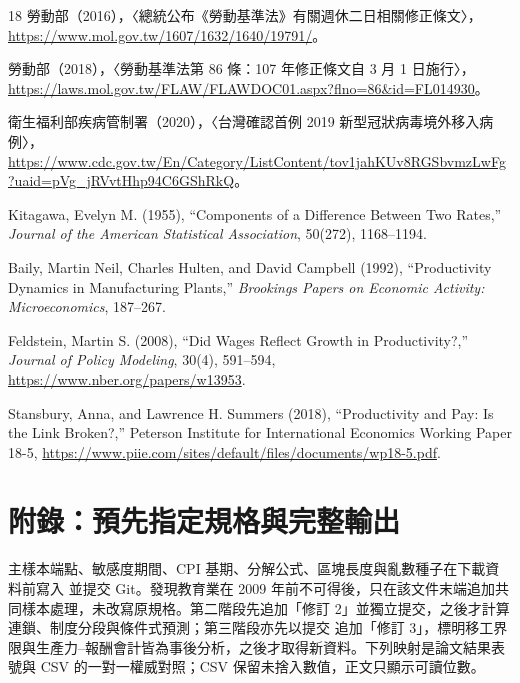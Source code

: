 \documentclass[12pt]{article}
\begin{document}
\begin{thebibliography}{18}
勞動部（2016），〈總統公布《勞動基準法》有關週休二日相關修正條文〉，\url{https://www.mol.gov.tw/1607/1632/1640/19791/}。

勞動部（2018），〈勞動基準法第 86 條：107 年修正條文自 3 月 1 日施行〉，\url{https://laws.mol.gov.tw/FLAW/FLAWDOC01.aspx?flno=86&id=FL014930}。

衛生福利部疾病管制署（2020），〈台灣確認首例 2019 新型冠狀病毒境外移入病例〉，\url{https://www.cdc.gov.tw/En/Category/ListContent/tov1jahKUv8RGSbvmzLwFg?uaid=pVg_jRVvtHhp94C6GShRkQ}。

Kitagawa, Evelyn M. (1955), ``Components of a Difference Between Two Rates,'' \textit{Journal of the American Statistical Association}, 50(272), 1168--1194.

Baily, Martin Neil, Charles Hulten, and David Campbell (1992), ``Productivity Dynamics in Manufacturing Plants,'' \textit{Brookings Papers on Economic Activity: Microeconomics}, 187--267.

Feldstein, Martin S. (2008), ``Did Wages Reflect Growth in Productivity?,'' \textit{Journal of Policy Modeling}, 30(4), 591--594, \url{https://www.nber.org/papers/w13953}.

Stansbury, Anna, and Lawrence H. Summers (2018), ``Productivity and Pay: Is the Link Broken?,'' Peterson Institute for International Economics Working Paper 18-5, \url{https://www.piie.com/sites/default/files/documents/wp18-5.pdf}.
\end{thebibliography}

\appendix
\section{附錄：預先指定規格與完整輸出}

主樣本端點、敏感度期間、CPI 基期、分解公式、區塊長度與亂數種子在下載資料前寫入  並提交 Git。發現教育業在 2009 年前不可得後，只在該文件末端追加共同樣本處理，未改寫原規格。第二階段先追加「修訂 2」並獨立提交，之後才計算連鎖、制度分段與條件式預測；第三階段亦先以提交  追加「修訂 3」，標明移工界限與生產力--報酬會計皆為事後分析，之後才取得新資料。下列映射是論文結果表號與 CSV 的一對一權威對照；CSV 保留未捨入數值，正文只顯示可讀位數。
\end{document}
